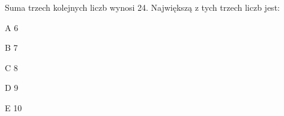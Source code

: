 \begin{tresc}
Suma trzech kolejnych liczb wynosi 24. Największą z tych trzech liczb jest:
\end{tresc}
\begin{wariant}{A} 6 \end{wariant}
\begin{wariant}{B} 7 \end{wariant}
\begin{wariant}{C} 8 \end{wariant}
\begin{wariant}{D} 9 \end{wariant}
\begin{wariant}{E} 10 \end{wariant}
